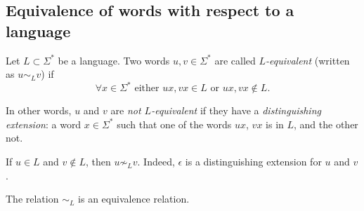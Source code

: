 \begin{page}
\setcounter{section}{4}
\setcounter{subsection}{1}
\setcounter{dfn}{0}
\label{portion:1042}

\subsection{Equivalence of words with respect to a language}

\end{page}

\begin{page}
\setcounter{section}{4}
\setcounter{subsection}{1}
\setcounter{dfn}{1}
\label{portion:1044}

\begin{dfn}
Let $L \subset \Sigma^*$ be a language.
Two words $u, v \in \Sigma^*$ are called \emph{$L$-equivalent} (written as $u \sim_L v$) if
\[
\forall x \in \Sigma^* \text{ either } ux, vx \in L \text{ or } ux, vx \notin L.
\]
\end{dfn}

\end{page}

\begin{page}
\setcounter{section}{4}
\setcounter{subsection}{1}
\setcounter{dfn}{1}
\label{portion:1045}


In other words, $u$ and $v$ are \emph{not $L$-equivalent} if they have a \emph{distinguishing extension}:
a word $x \in \Sigma^*$ such that one of the words $ux$, $vx$ is in $L$, and the other not.


\end{page}

\begin{page}
\setcounter{section}{4}
\setcounter{subsection}{1}
\setcounter{dfn}{2}
\label{portion:1047}

\begin{exl}
\label{exl:LEquiv}
If $u \in L$ and $v \notin L$, then $u \not\sim_L v$.
Indeed, $\epsilon$ is a distinguishing extension for $u$ and $v$.
\end{exl}

\end{page}

\begin{page}
\setcounter{section}{4}
\setcounter{subsection}{1}
\setcounter{dfn}{3}
\label{portion:1050}

\begin{lem}
The relation $\sim_L$ is an equivalence relation.
\end{lem}

\end{page}

